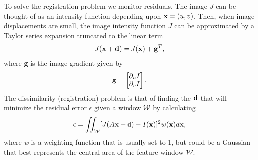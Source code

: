 \documentclass{article}
\begin{document}
To solve the registration problem we monitor residuals.  The image $J$ can be thought of as an intensity function depending upon ${\bf x} = (u,v)$.  Then, when image displacements are small, the image intensity function $J$ can be approximated by a Taylor series expansion truncated to the linear term
\begin{equation}
  J({\bf x + d}) = J({\bf x}) + {\bf g}^T,\label{eq:taylor}
\end{equation}
where {\bf g} is the image gradient given by
\[
{\bf g} =
\begin{bmatrix}
  \partial_u I\\
  \partial_v I
\end{bmatrix}.
\]
The dissimilarity (registration) problem is that of finding the ${\bf d}$ that will minimize the residual error $\epsilon$ given a window $\mathcal{W}$ by calculating
\begin{equation}
  \epsilon = \iint_{\mathcal{W}}[J(A{\bf x + d})- I({\bf x})]^{2} w({\bf x})d{\bf x},
  \label{eq:epserror}
\end{equation}
where {\em w} is a weighting function that is usually set to 1, but could be a Gaussian that best represents the central area of the feature window ${\mathcal{W}}$.

\end{document}
